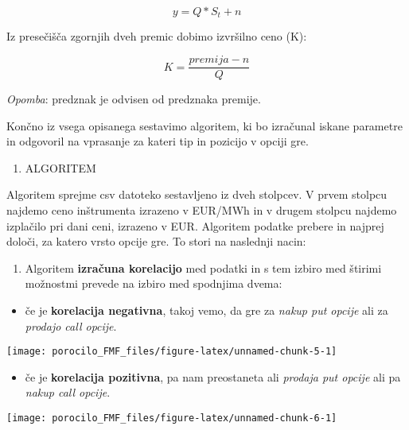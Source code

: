 \documentclass[
]{article}
\providecommand{\tightlist}{%
  \setlength{\itemsep}{0pt}\setlength{\parskip}{0pt}}
\begin{document}
\[ y =  Q * S_t + n\]

Iz presečišča zgornjih dveh premic dobimo izvršilno ceno (K):

\[ K = \frac{premija - n}{Q} \]

\emph{Opomba}: predznak je odvisen od predznaka premije.

Končno iz vsega opisanega sestavimo algoritem, ki bo izračunal iskane
parametre in odgovoril na vprasanje za kateri tip in pozicijo v opciji
gre.

\begin{enumerate}
\def\labelenumi{\arabic{enumi}.}
\setcounter{enumi}{2}
\tightlist
\item
  ALGORITEM
\end{enumerate}

Algoritem sprejme csv datoteko sestavljeno iz dveh stolpcev. V prvem
stolpcu najdemo ceno inštrumenta izrazeno v EUR/MWh in v drugem stolpcu
najdemo izplačilo pri dani ceni, izrazeno v EUR. Algoritem podatke
prebere in najprej določi, za katero vrsto opcije gre. To stori na
naslednji nacin:

\begin{enumerate}
\def\labelenumi{\arabic{enumi}.}
\tightlist
\item
  Algoritem \textbf{izračuna korelacijo} med podatki in s tem izbiro med
  štirimi možnostmi prevede na izbiro med spodnjima dvema:
\end{enumerate}

\begin{itemize}
\tightlist
\item
  če je \textbf{korelacija negativna}, takoj vemo, da gre za \emph{nakup
  put opcije} ali za \emph{prodajo call opcije}.
\end{itemize}

\begin{center}\texttt{[image: porocilo\_FMF\_files/figure-latex/unnamed-chunk-5-1]} \end{center}

\begin{itemize}
\tightlist
\item
  če je \textbf{korelacija pozitivna}, pa nam preostaneta ali
  \emph{prodaja put opcije} ali pa \emph{nakup call opcije}.
\end{itemize}

\begin{center}\texttt{[image: porocilo\_FMF\_files/figure-latex/unnamed-chunk-6-1]} \end{center}
\end{document}
